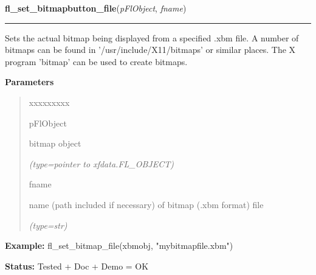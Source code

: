     \vspace{0.5ex}

\hspace{.8\funcindent}\begin{boxedminipage}{\funcwidth}

    \raggedright \textbf{fl\_set\_bitmapbutton\_file}(\textit{pFlObject}, \textit{fname})

    \vspace{-1.5ex}

    \rule{\textwidth}{0.5\fboxrule}
\setlength{\parskip}{2ex}
    Sets the actual bitmap being displayed from a specified .xbm file. A 
    number of bitmaps can be found in '/usr/include/X11/bitmaps' or similar
    places. The X program 'bitmap' can be used to create bitmaps.

\setlength{\parskip}{1ex}
      \textbf{Parameters}
      \vspace{-1ex}

      \begin{quote}
        \begin{Ventry}{xxxxxxxxx}

          \item[pFlObject]

          bitmap object

            {\it (type=pointer to xfdata.FL\_OBJECT)}

          \item[fname]

          name (path included if necessary) of bitmap (.xbm format) file

            {\it (type=str)}

        \end{Ventry}

      \end{quote}

\textbf{Example:} fl\_set\_bitmap\_file(xbmobj, "mybitmapfile.xbm")



\textbf{Status:} Tested + Doc + Demo = OK



    \end{boxedminipage}

    \label{xformslib:flbitmap:fl_set_bitmap_file}

    \vspace{0.5ex}

